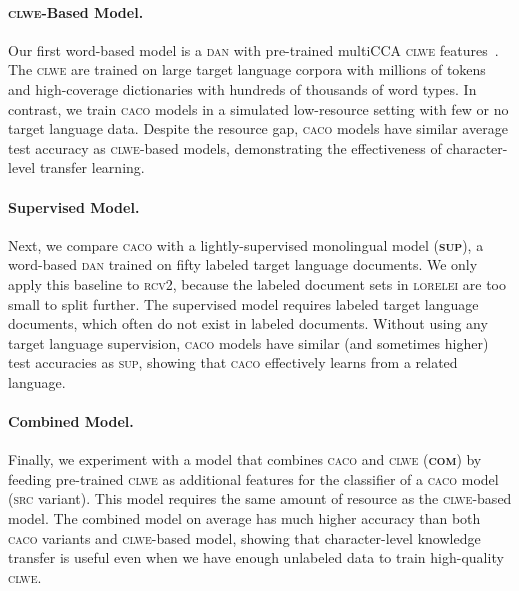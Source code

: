 \documentclass[letterpaper]{article} %
\newcommand{\citep}{\cite}
\newcommand{\abr}[1]{\textsc{#1}}
\newcommand{\name}[0]{\textsc{caco}}
\begin{document}
\paragraph{\abr{clwe}-Based Model.}
Our first word-based model is a \abr{dan} with pre-trained multiCCA \abr{clwe}
features~\citep{ammar-16}.
The \abr{clwe} are trained on large target language corpora with millions of
tokens and high-coverage dictionaries with hundreds of thousands of word types.
In contrast, we train \name{} models in a simulated low-resource setting with
few or no target language data.
Despite the resource gap, \name{} models have similar average test accuracy as
\abr{clwe}-based models, demonstrating the effectiveness of character-level
transfer learning.

\paragraph{Supervised Model.}
Next, we compare \name{} with a lightly-supervised monolingual model
(\textbf{\abr{sup}}), a word-based \abr{dan} trained on fifty labeled target
language documents.
We only apply this baseline to \abr{rcv2}, because the labeled document sets in
\abr{lorelei} are too small to split further.
The supervised model requires labeled target language documents, which often
do not exist in labeled documents.
Without using any target language supervision, \name{} models have similar
(and sometimes higher) test accuracies as \abr{sup}, showing that \name{}
effectively learns from a related language.

\paragraph{Combined Model.}
Finally, we experiment with a model that combines \name{} and
\abr{clwe} (\textbf{\abr{com}}) by feeding pre-trained \abr{clwe} as
additional features for the classifier of a \name{} model (\abr{src}
variant).
This model requires the same amount of resource as the \abr{clwe}-based model.
The combined model on average has much higher accuracy than
both \abr{caco} variants and \abr{clwe}-based model, showing that
character-level knowledge transfer is useful even when we have enough
unlabeled data to train high-quality \abr{clwe}.
\end{document}
